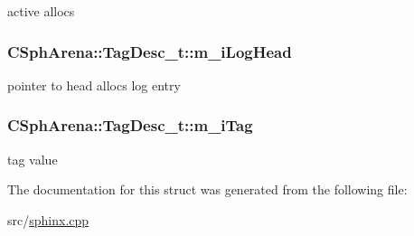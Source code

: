 active allocs 

\hypertarget{structCSphArena_1_1TagDesc__t_ac53ca37b13b3521ce93dfd5378d90e3e}{
\subsubsection[{m\-\_\-i\-Log\-Head}]{ C\-Sph\-Arena\-::\-Tag\-Desc\-\_\-t\-::m\-\_\-i\-Log\-Head}}\label{structCSphArena_1_1TagDesc__t_ac53ca37b13b3521ce93dfd5378d90e3e}


pointer to head allocs log entry 

\hypertarget{structCSphArena_1_1TagDesc__t_a710b012c4284e49461b746b847881358}{
\subsubsection[{m\-\_\-i\-Tag}]{ C\-Sph\-Arena\-::\-Tag\-Desc\-\_\-t\-::m\-\_\-i\-Tag}}\label{structCSphArena_1_1TagDesc__t_a710b012c4284e49461b746b847881358}


tag value 



The documentation for this struct was generated from the following file\-:\begin{DoxyCompactItemize}
\item 
src/\hyperlink{sphinx_8cpp}{sphinx.\-cpp}\end{DoxyCompactItemize}
